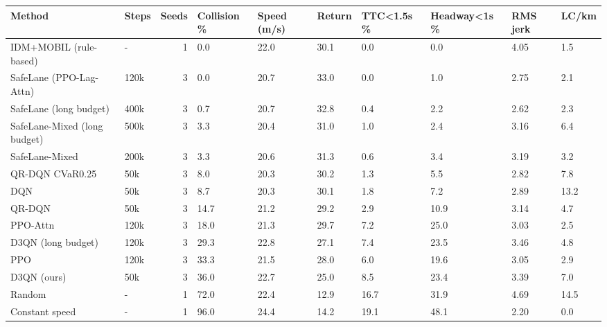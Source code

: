 \begin{tabular}{llrlllllll}
\toprule
Method & Steps & Seeds & Collision \% & Speed (m/s) & Return & TTC<1.5s \% & Headway<1s \% & RMS jerk & LC/km \\
\midrule
IDM+MOBIL (rule-based) & - & 1 & 0.0 & 22.0 & 30.1 & 0.0 & 0.0 & 4.05 & 1.5 \\
SafeLane (PPO-Lag-Attn) & 120k & 3 & 0.0 & 20.7 & 33.0 & 0.0 & 1.0 & 2.75 & 2.1 \\
SafeLane (long budget) & 400k & 3 & 0.7 & 20.7 & 32.8 & 0.4 & 2.2 & 2.62 & 2.3 \\
SafeLane-Mixed (long budget) & 500k & 3 & 3.3 & 20.4 & 31.0 & 1.0 & 2.4 & 3.16 & 6.4 \\
SafeLane-Mixed & 200k & 3 & 3.3 & 20.6 & 31.3 & 0.6 & 3.4 & 3.19 & 3.2 \\
QR-DQN CVaR0.25 & 50k & 3 & 8.0 & 20.3 & 30.2 & 1.3 & 5.5 & 2.82 & 7.8 \\
DQN & 50k & 3 & 8.7 & 20.3 & 30.1 & 1.8 & 7.2 & 2.89 & 13.2 \\
QR-DQN & 50k & 3 & 14.7 & 21.2 & 29.2 & 2.9 & 10.9 & 3.14 & 4.7 \\
PPO-Attn & 120k & 3 & 18.0 & 21.3 & 29.7 & 7.2 & 25.0 & 3.03 & 2.5 \\
D3QN (long budget) & 120k & 3 & 29.3 & 22.8 & 27.1 & 7.4 & 23.5 & 3.46 & 4.8 \\
PPO & 120k & 3 & 33.3 & 21.5 & 28.0 & 6.0 & 19.6 & 3.05 & 2.9 \\
D3QN (ours) & 50k & 3 & 36.0 & 22.7 & 25.0 & 8.5 & 23.4 & 3.39 & 7.0 \\
Random & - & 1 & 72.0 & 22.4 & 12.9 & 16.7 & 31.9 & 4.69 & 14.5 \\
Constant speed & - & 1 & 96.0 & 24.4 & 14.2 & 19.1 & 48.1 & 2.20 & 0.0 \\
\bottomrule
\end{tabular}
